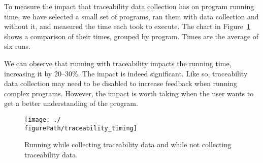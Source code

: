 To measure the impact that traceability data collection has on program running time, we have selected a small set of programs, ran them with data collection and without it, and measured the time each took to execute.
The chart in Figure~\ref{fig:traceability:timing} shows a comparison of their times, grouped by program.
Times are the average of six runs.

We can observe that running with traceability impacts the running time, increasing it by 20--30\%.
The impact is indeed significant.
Like so, traceability data collection may need to be disabled to increase feedback when running complex programs.
However, the impact is worth taking when the user wants to get a better understanding of the program.

\begin{figure}
  \centering
  \texttt{[image: ./\\figurePath/traceability\_timing]}
  \caption{Running while collecting traceability data and while not collecting traceability data.}
  \label{fig:traceability:timing}
\end{figure}
